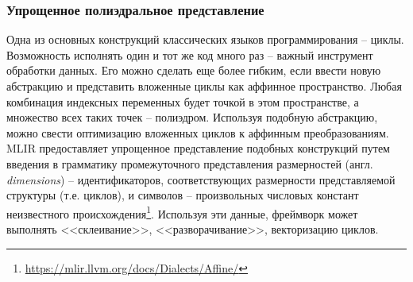 \subsubsection{Упрощенное полиэдральное представление}
Одна из основных конструкций классических языков программирования -- циклы.
Возможность исполнять один и тот же код много раз -- важный инструмент обработки
данных. Его можно сделать еще более гибким, если ввести новую абстракцию и
представить вложенные циклы как аффинное пространство. Любая комбинация
индексных переменных будет точкой в этом пространстве, а множество всех таких
точек -- полиэдром. Используя подобную абстракцию, можно свести оптимизацию
вложенных циклов к аффинным преобразованиям. MLIR предоставляет упрощенное
представление подобных конструкций путем введения в грамматику промежуточного
представления размерностей (англ. \textit{dimensions}) -- идентификаторов,
соответствующих размерности представляемой структуры (т.е. циклов), и символов --
произвольных числовых констант неизвестного происхождения\footnote{\url{https://mlir.llvm.org/docs/Dialects/Affine/}}.
Используя эти данные, фреймворк может выполнять <<склеивание>>,
<<разворачивание>>, векторизацию циклов.
